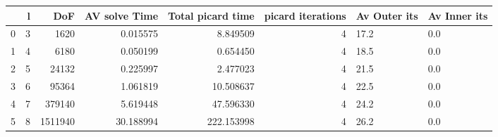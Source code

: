 \begin{tabular}{lrrrrrll}
\toprule
{} &  l &      DoF &  AV solve Time &  Total picard time &  picard iterations & Av Outer its & Av Inner its \\
\midrule
0 &  3 &     1620 &       0.015575 &           8.849509 &                  4 &         17.2 &          0.0 \\
1 &  4 &     6180 &       0.050199 &           0.654450 &                  4 &         18.5 &          0.0 \\
2 &  5 &    24132 &       0.225997 &           2.477023 &                  4 &         21.5 &          0.0 \\
3 &  6 &    95364 &       1.061819 &          10.508637 &                  4 &         22.5 &          0.0 \\
4 &  7 &   379140 &       5.619448 &          47.596330 &                  4 &         24.2 &          0.0 \\
5 &  8 &  1511940 &      30.188994 &         222.153998 &                  4 &         26.2 &          0.0 \\
\bottomrule
\end{tabular}
